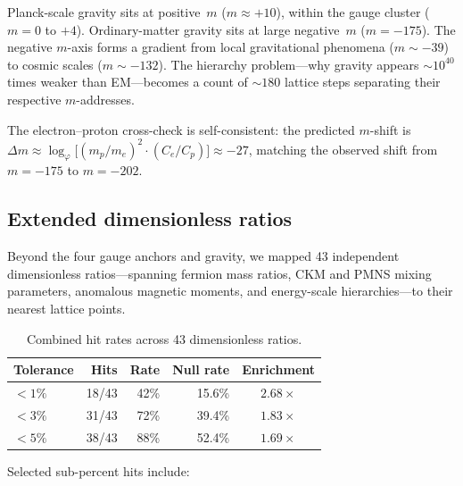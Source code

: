 \documentclass[12pt,a4paper]{article}
\newcommand{\vp}{\varphi}
\begin{document}
Planck-scale gravity sits at positive~$m$ ($m \approx +10$), within the gauge
cluster ($m = 0$ to $+4$).  Ordinary-matter gravity sits at large
negative~$m$ ($m = -175$).  The negative $m$-axis forms a gradient from
local gravitational phenomena ($m \sim -39$) to cosmic scales ($m \sim -132$).
The hierarchy problem---why gravity appears $\sim\!10^{40}$ times weaker than
EM---becomes a count of $\sim\!180$ lattice steps separating their respective
$m$-addresses.

The electron--proton cross-check is self-consistent: the predicted $m$-shift
is $\Delta m \approx \log_\vp\!\bigl[(m_p/m_e)^2 \cdot (C_e/C_p)\bigr]
\approx -27$, matching the observed shift from $m = -175$ to $m = -202$.

\subsection{Extended dimensionless ratios}
\label{sec:extended}

Beyond the four gauge anchors and gravity, we mapped 43 independent
dimensionless ratios---spanning fermion mass ratios, CKM and PMNS mixing
parameters, anomalous magnetic moments, and energy-scale hierarchies---to
their nearest lattice points.

\begin{table}[H]
\centering
\caption{Combined hit rates across 43 dimensionless ratios.}
\label{tab:combined_hits}
\begin{tabular}{@{}lrrrc@{}}
\toprule
Tolerance & Hits & Rate & Null rate & Enrichment \\
\midrule
$< 1\%$ & 18/43 & 42\% & 15.6\% & $\mathbf{2.68\times}$ \\
$< 3\%$ & 31/43 & 72\% & 39.4\% & $1.83\times$ \\
$< 5\%$ & 38/43 & 88\% & 52.4\% & $1.69\times$ \\
\bottomrule
\end{tabular}
\end{table}

Selected sub-percent hits include:
\end{document}
